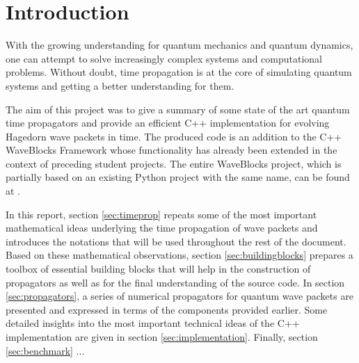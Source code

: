 \section*{Introduction}
%
With the growing understanding for quantum mechanics and quantum dynamics, one can attempt to solve increasingly complex systems and computational problems.
Without doubt, time propagation is at the core of simulating quantum systems and getting a better understanding for them.
\par\medskip
%
The aim of this project was to give a summary of some state of the art quantum time propagators and provide an efficient C++ implementation for evolving Hagedorn wave packets in time.
The produced code is an addition to the C++ WaveBlocks Framework whose functionality has already been extended in the context of preceding student projects.
The entire WaveBlocks project, which is partially based on an existing Python project with the same name, can be found at \cite{libwaveblocks}.
\par\medskip
%
In this report, section \ref{sec:timeprop} repeats some of the most important mathematical ideas underlying the time propagation of wave packets and introduces the notations that will be used throughout the rest of the document.
Based on these mathematical observations, section \ref{sec:buildingblocks} prepares a toolbox of essential building blocks that will help in the construction of propagators as well as for the final understanding of the source code.
In section \ref{sec:propagators}, a series of numerical propagators for quantum wave packets are presented and expressed in terms of the components provided earlier.
Some detailed insights into the most important technical ideas of the C++ implementation are given in section \ref{sec:implementation}.
Finally, section \ref{sec:benchmark} ...
